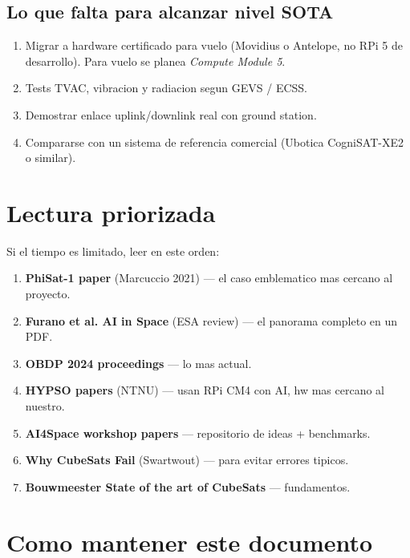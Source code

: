 \documentclass[11pt,a4paper,oneside]{report}
\begin{document}
\section{Lo que falta para alcanzar nivel SOTA}

\begin{enumerate}[leftmargin=2em]
  \item Migrar a hardware certificado para vuelo (Movidius o Antelope, no
        RPi 5 de desarrollo). Para vuelo se planea \emph{Compute Module 5}.
  \item Tests TVAC, vibracion y radiacion segun GEVS / ECSS.
  \item Demostrar enlace uplink/downlink real con ground station.
  \item Compararse con un sistema de referencia comercial (Ubotica
        CogniSAT-XE2 o similar).
\end{enumerate}

\chapter{Lectura priorizada}

Si el tiempo es limitado, leer en este orden:

\begin{enumerate}[leftmargin=2.2em, label=\arabic*.]
  \item \textbf{PhiSat-1 paper} (Marcuccio 2021) --- el caso emblematico
        mas cercano al proyecto.
  \item \textbf{Furano et al. AI in Space} (ESA review) --- el panorama
        completo en un PDF.
  \item \textbf{OBDP 2024 proceedings} --- lo mas actual.
  \item \textbf{HYPSO papers} (NTNU) --- usan RPi CM4 con AI, hw mas
        cercano al nuestro.
  \item \textbf{AI4Space workshop papers} --- repositorio de ideas + benchmarks.
  \item \textbf{Why CubeSats Fail} (Swartwout) --- para evitar errores tipicos.
  \item \textbf{Bouwmeester State of the art of CubeSats} --- fundamentos.
\end{enumerate}

\chapter*{Como mantener este documento}
\end{document}
